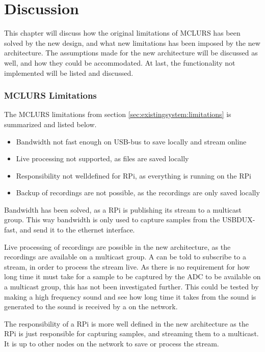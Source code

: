\chapter{Discussion}\label{chp:discussion}
This chapter will discuss how the original limitations of MCLURS has been solved by the new design, and what new limitations has been imposed by the new architecture. The assumptions made for the new architecture will be discussed as well, and how they could be accommodated. At last, the functionality not implemented will be listed and discussed.

\subsection{MCLURS Limitations}

\noindent{}The MCLURS limitations from section \ref{sec:existingsystem:limitations} is summarized and listed below.
\begin{itemize}
	\item Bandwidth not fast enough on USB-bus to save locally and stream online
	\item Live processing not supported, as files are saved locally
	\item Responsibility not welldefined for RPi, as everything is running on the RPi
	\item Backup of recordings are not possible, as the recordings are only saved locally
\end{itemize} 

Bandwidth has been solved, as a RPi is publishing its stream to a multicast group. This way bandwidth is only used to capture samples from the USBDUX-fast, and send it to the ethernet interface.
 
Live processing of recordings are possible in the new architecture, as the recordings are available on a multicast group. A \sub{} can be told to subscribe to a stream, in order to process the stream live. As there is no requirement for how long time it must take for a sample to be captured by the ADC to be available on a multicast group, this has not been investigated further. This could be tested by making a high frequency sound and see how long time it takes from the sound is generated to the sound is received by a  on the network.

The responsibility of a RPi is more well defined in the new architecture as the RPi is just responsible for capturing samples, and streaming them to a multicast. It is up to other nodes on the network to save or process the stream.

